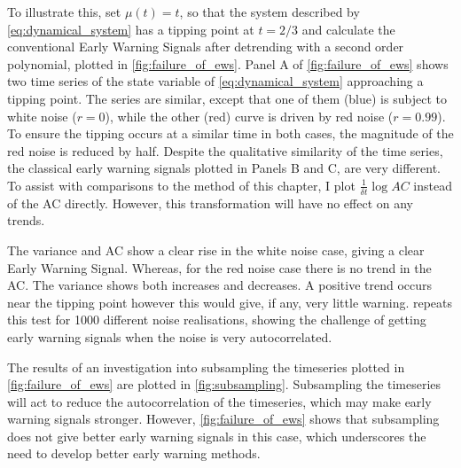 To illustrate this, set $\mu(t) = t$, so that the system described by \cref{eq:dynamical_system} has
a tipping point at $t=2/3$ and calculate the conventional Early 
Warning Signals after detrending with a second order polynomial, plotted in \cref{fig:failure_of_ews}.
Panel A of \cref{fig:failure_of_ews} shows two time series of the 
state variable of \cref{eq:dynamical_system} approaching a tipping point.
The series are similar, except that one of them (blue) is subject to white noise ($r = 0$), 
while the other (red) curve is driven by red noise ($r = 0.99$). To
ensure the tipping occurs at a similar time in both
cases, the magnitude of the red noise is reduced by half.
Despite the qualitative similarity of the time series,
the classical early warning signals plotted in Panels B and C, are very different. To assist with comparisons to the method of this chapter, I
plot $\frac{1}{\delta t}\log AC$ instead of the AC directly. However, this
transformation will have no effect on any trends.

The variance and AC show a clear rise in
the white noise case, giving a clear Early Warning Signal. 
Whereas, for the red noise case there is no trend in the AC\@. The 
variance shows both increases and decreases. A positive trend occurs near
the tipping point however this would give, if any, very little warning. 
repeats this test for 1000 different noise realisations, showing the
challenge of getting early warning signals when the noise is very 
autocorrelated.

The results of an investigation into subsampling the timeseries plotted in \cref{fig:failure_of_ews} are plotted in \cref{fig:subsampling}.
Subsampling the timeseries will act to reduce the autocorrelation of the timeseries, which may make early warning signals stronger.
However, \cref{fig:failure_of_ews} shows that subsampling does not give better early warning signals in this case, which underscores the need
to develop better early warning methods.

